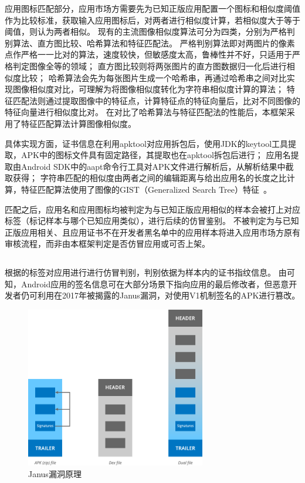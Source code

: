 应用图标匹配部分，应用市场方需要先为已知正版应用配置一个图标和相似度阈值作为比较标准，\componentA 获取输入应用图标后，对两者进行相似度计算，若相似度大于等于阈值，则认为两者相似。
现有的主流图像相似度算法可分为四类，分别为严格判别算法、直方图比较、哈希算法和特征匹配法。
严格判别算法即对两图片的像素点作严格一一比对的算法，速度较快，但敏感度太高，鲁棒性并不好，只适用于严格判定图像全等的领域；
直方图比较则将两张图片的直方图数据归一化后进行相似度比较；
哈希算法会先为每张图片生成一个哈希串，再通过哈希串之间对比实现图像相似度对比，可理解为将图像相似度转化为字符串相似度计算的算法；
特征匹配法则通过提取图像中的特征点，计算特征点的特征向量后，比对不同图像的特征向量进行相似度比对。
在对比了哈希算法与特征匹配法的性能后，本框架采用了特征匹配算法计算图像相似度。

具体实现方面，证书信息在利用apktool对应用拆包后，使用JDK的keytool工具提取，APK中的图标文件具有固定路径，其提取也在apktool拆包后进行；
应用名提取由Android SDK中的aapt命令行工具对APK文件进行解析后，从解析结果中截取获得；
字符串匹配的相似度由两者之间的编辑距离与给出应用名的长度之比计算，特征匹配算法使用了图像的GIST（Generalized Search Tree）特征~\cite{torralba2003context}。

匹配之后，应用名和应用图标均被判定为与已知正版应用相似的样本会被打上对应标签（标记样本与哪个已知应用类似），进行后续的仿冒鉴别。
不被\componentA 判定为与已知正版应用相关、且应用证书不在开发者黑名单中的应用样本将进入应用市场方原有审核流程，而非由本框架判定是否仿冒应用或可否上架。

\subsection{\componentB }
\componentB 根据\componentA 的标签对应用进行进行仿冒判别，判别依据为样本内的证书指纹信息。
由可知，Android应用的签名信息可在大部分场景下指向应用的最后修改者，但恶意开发者仍可利用在2017年被揭露的Janus漏洞，对使用V1机制签名的APK进行篡改。

\begin{figure}[htbp]
    \centering
    \includegraphics[width=0.7\textwidth]{./Figures/edwin-janus}
    \caption{Janus漏洞原理}
    \label{fig:how_janus_works}
    \vspace{-3mm}
\end{figure}

